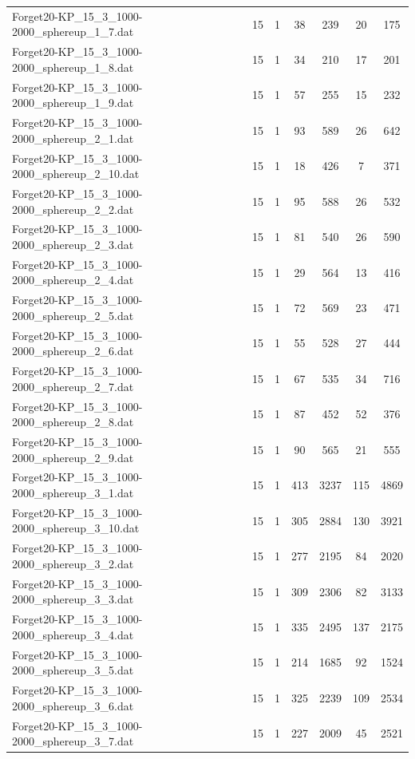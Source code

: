 \begin{table}[!ht]
\begin{tabular}{lcccccc}
Forget20-KP\_15\_3\_1000-2000\_sphereup\_1\_7.dat & 15 & 1 & 38 & 239 & 20 & 175 \\
Forget20-KP\_15\_3\_1000-2000\_sphereup\_1\_8.dat & 15 & 1 & 34 & 210 & 17 & 201 \\
Forget20-KP\_15\_3\_1000-2000\_sphereup\_1\_9.dat & 15 & 1 & 57 & 255 & 15 & 232 \\
Forget20-KP\_15\_3\_1000-2000\_sphereup\_2\_1.dat & 15 & 1 & 93 & 589 & 26 & 642 \\
Forget20-KP\_15\_3\_1000-2000\_sphereup\_2\_10.dat & 15 & 1 & 18 & 426 & 7 & 371 \\
Forget20-KP\_15\_3\_1000-2000\_sphereup\_2\_2.dat & 15 & 1 & 95 & 588 & 26 & 532 \\
Forget20-KP\_15\_3\_1000-2000\_sphereup\_2\_3.dat & 15 & 1 & 81 & 540 & 26 & 590 \\
Forget20-KP\_15\_3\_1000-2000\_sphereup\_2\_4.dat & 15 & 1 & 29 & 564 & 13 & 416 \\
Forget20-KP\_15\_3\_1000-2000\_sphereup\_2\_5.dat & 15 & 1 & 72 & 569 & 23 & 471 \\
Forget20-KP\_15\_3\_1000-2000\_sphereup\_2\_6.dat & 15 & 1 & 55 & 528 & 27 & 444 \\
Forget20-KP\_15\_3\_1000-2000\_sphereup\_2\_7.dat & 15 & 1 & 67 & 535 & 34 & 716 \\
Forget20-KP\_15\_3\_1000-2000\_sphereup\_2\_8.dat & 15 & 1 & 87 & 452 & 52 & 376 \\
Forget20-KP\_15\_3\_1000-2000\_sphereup\_2\_9.dat & 15 & 1 & 90 & 565 & 21 & 555 \\
Forget20-KP\_15\_3\_1000-2000\_sphereup\_3\_1.dat & 15 & 1 & 413 & 3237 & 115 & 4869 \\
Forget20-KP\_15\_3\_1000-2000\_sphereup\_3\_10.dat & 15 & 1 & 305 & 2884 & 130 & 3921 \\
Forget20-KP\_15\_3\_1000-2000\_sphereup\_3\_2.dat & 15 & 1 & 277 & 2195 & 84 & 2020 \\
Forget20-KP\_15\_3\_1000-2000\_sphereup\_3\_3.dat & 15 & 1 & 309 & 2306 & 82 & 3133 \\
Forget20-KP\_15\_3\_1000-2000\_sphereup\_3\_4.dat & 15 & 1 & 335 & 2495 & 137 & 2175 \\
Forget20-KP\_15\_3\_1000-2000\_sphereup\_3\_5.dat & 15 & 1 & 214 & 1685 & 92 & 1524 \\
Forget20-KP\_15\_3\_1000-2000\_sphereup\_3\_6.dat & 15 & 1 & 325 & 2239 & 109 & 2534 \\
Forget20-KP\_15\_3\_1000-2000\_sphereup\_3\_7.dat & 15 & 1 & 227 & 2009 & 45 & 2521 \\

\end{tabular}
\end{table}
